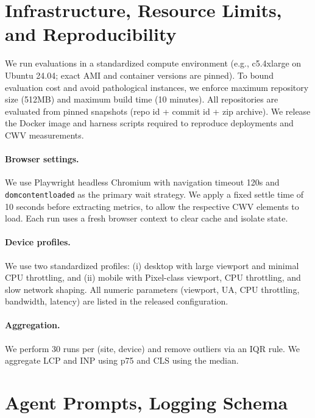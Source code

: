 \section{Infrastructure, Resource Limits, and Reproducibility}
\label{app:infra}

We run evaluations in a standardized compute environment (e.g., c5.4xlarge on Ubuntu 24.04; exact AMI and container versions are pinned). To bound evaluation cost and avoid pathological instances, we enforce maximum repository size (512MB) and maximum build time (10 minutes). All repositories are evaluated from pinned snapshots (repo id + commit id + zip archive). We release the Docker image and harness scripts required to reproduce deployments and CWV measurements.

\label{app:hyperparams}

\paragraph{Browser settings.}
We use Playwright headless Chromium with navigation timeout 120s and \texttt{domcontentloaded} as the primary wait strategy. We apply a fixed settle time of 10 seconds before extracting metrics, to allow the respective CWV elements to load. Each run uses a fresh browser context to clear cache and isolate state.

\paragraph{Device profiles.}
We use two standardized profiles:
(i) desktop with large viewport and minimal CPU throttling, and 
(ii) mobile with Pixel-class viewport, CPU throttling, and slow network shaping.
All numeric parameters (viewport, UA, CPU throttling, bandwidth, latency) are listed in the released configuration.

\paragraph{Aggregation.}
We perform 30 runs per (site, device) and remove outliers via an IQR rule. We aggregate LCP and INP using p75 and CLS using the median.


\section{Agent Prompts, Logging Schema}
\label{app:agent_scripts}
\label{app:logging}

